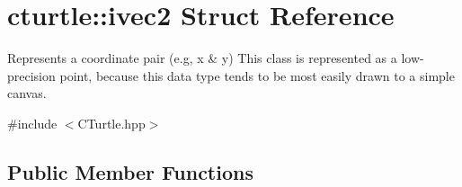 \hypertarget{structcturtle_1_1ivec2}{}\section{cturtle\+:\+:ivec2 Struct Reference}
\label{structcturtle_1_1ivec2}


Represents a coordinate pair (e.\+g, x \& y) This class is represented as a low-\/precision point, because this data type tends to be most easily drawn to a simple canvas.  




{\ttfamily \#include $<$C\+Turtle.\+hpp$>$}

\subsection*{Public Member Functions}
